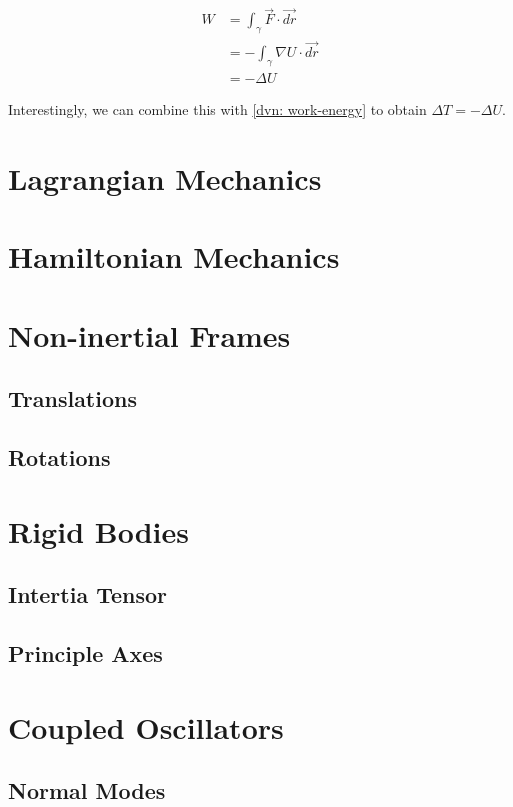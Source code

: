 \documentclass[main.tex]{subfiles}
\begin{document}
\begin{align*}
W &= \int_{\gamma} \vec{F} \cdot \vec{dr} \\
&= - \int_{\gamma} \nabla U \cdot \vec{dr} \\
&= - \Delta U
\end{align*}

Interestingly, we can combine this with \cref{dvn: work-energy} to obtain
$\Delta T = -\Delta U$.

\chapter{Lagrangian Mechanics} \label{ch: lagrangian-mechanics}

\chapter{Hamiltonian Mechanics} \label{ch: hamiltonian-mechanics}

\chapter{Non-inertial Frames}

\section{Translations}

\section{Rotations}

\chapter{Rigid Bodies}

\section{Intertia Tensor}

\section{Principle Axes}

\chapter{Coupled Oscillators}

\section{Normal Modes}
\end{document}
